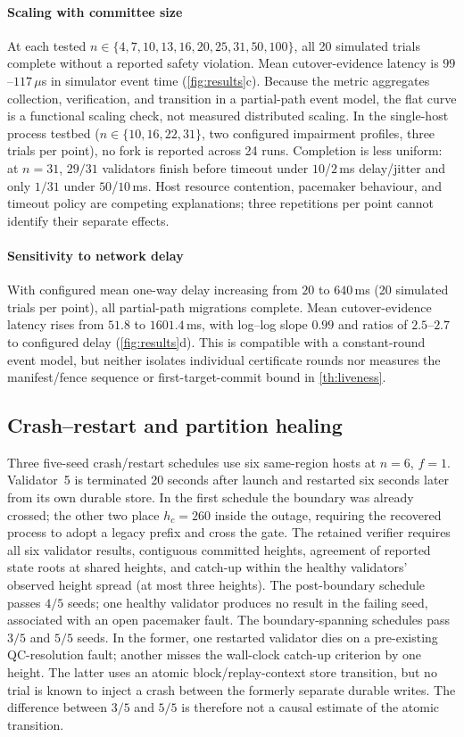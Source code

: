 \paragraph{Scaling with committee size}
At each tested $n\in\{4,7,10,13,16,20,25,31,50,100\}$, all 20 simulated trials
complete without a reported safety violation. Mean cutover-evidence latency is
$99$--$117\,\mu$s in simulator event time (\cref{fig:results}c). Because the metric
aggregates collection, verification, and transition in a partial-path event model,
the flat curve is a functional scaling check, not measured distributed scaling. In
the single-host process testbed ($n\in\{10,16,22,31\}$, two configured impairment
profiles, three trials per point), no fork is reported across 24 runs. Completion
is less uniform: at $n=31$, $29/31$ validators finish before timeout under
$10$/$2$\,ms delay/jitter and only $1/31$ under $50$/$10$\,ms. Host resource
contention, pacemaker behaviour, and timeout policy are competing explanations;
three repetitions per point cannot identify their separate effects.

\paragraph{Sensitivity to network delay}
With configured mean one-way delay increasing from $20$ to $640$\,ms (20 simulated
trials per point), all partial-path migrations complete. Mean cutover-evidence
latency rises from $51.8$ to $1601.4$\,ms, with log--log slope $0.99$ and ratios
of $2.5$--$2.7$ to configured delay (\cref{fig:results}d). This is compatible with
a constant-round event model, but neither isolates individual certificate rounds
nor measures the manifest/fence sequence or first-target-commit bound in
\cref{th:liveness}.

\subsection{Crash--restart and partition healing}
\label{sec:crash-recovery}
Three five-seed crash/restart schedules use six same-region hosts at $n=6$, $f=1$.
Validator~5 is terminated 20 seconds after launch and restarted six seconds later
from its own durable store. In the first schedule the boundary was already crossed;
the other two place $h_c=260$ inside the outage, requiring the recovered process to
adopt a legacy prefix and cross the \CutCert{} gate. The retained verifier requires
all six validator results, contiguous committed heights, agreement of reported
state roots at shared heights, and catch-up within the healthy validators' observed
height spread (at most three heights). The post-boundary schedule passes $4/5$ seeds;
one healthy validator produces no result in the failing seed, associated with an
open pacemaker fault. The boundary-spanning schedules pass $3/5$ and $5/5$ seeds.
In the former, one restarted validator dies on a pre-existing QC-resolution fault;
another misses the wall-clock catch-up criterion by one height. The latter uses an
atomic block/replay-context store transition, but no trial is known to inject a
crash between the formerly separate durable writes. The difference between $3/5$
and $5/5$ is therefore not a causal estimate of the atomic transition.

